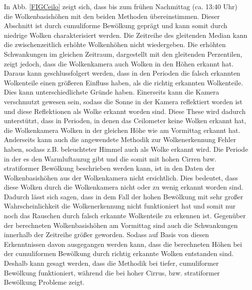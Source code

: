 \documentclass[a4paper,11pt,twoside,german]{article}
\newcommand{\absatz}{\smallbreak}
\begin{document}
In Abb. \ref{FIGCeilo} zeigt sich, dass bis zum frühen Nachmittag (ca. 13:40 Uhr) die Wolkenbasishöhen mit den beiden Methoden übereinstimmen. Dieser Abschnitt ist durch cumuliforme Bewölkung geprägt und kann somit durch niedrige Wolken charakterisiert werden. Die Zeitreihe des gleitenden Median kann die zwischenzeitlich erhöhte Wolkenhöhen nicht wiedergeben. Die erhöhten Schwankungen im gleichen Zeitraum, dargestellt mit den gleitenden Perzentilen, zeigt jedoch, dass die Wolkenkamera auch Wolken in den Höhen erkannt hat. Daraus kann geschlussfolgert werden, dass in den Perioden die falsch erkannten Wolkenteile einen größeren Einfluss haben, als die richtig erkannten Wolkenteile. Dies kann unterschiedlichste Gründe haben. Einerseits kann die Kamera verschmutzt gewesen sein, sodass die Sonne in der Kamera reflektiert worden ist und diese Reflektionen als Wolke erkannt worden sind. Diese These wird dadurch unterstützt, dass in Perioden, in denen das Ceilometer keine Wolken erkannt hat, die Wolkenkamera Wolken in der gleichen Höhe wie am Vormittag erkannt hat. Anderseits kann auch die angewendete Methodik zur Wolkenerkennung Fehler haben, sodass z.B. beleuchteter Himmel auch als Wolke erkannt wird.\absatz
Die Periode in der es den Warmluftauzug gibt und die somit mit hohen Cirren bzw. stratiformer Bewölkung beschrieben werden kann, ist in den Daten der Wolkenbasishöhen aus der Wolkenkamera nicht ersichtlich. Dies bedeutet, dass diese Wolken durch die Wolkenkamera nicht oder zu wenig erkannt worden sind. Dadurch lässt sich sagen, dass in dem Fall der hohen Bewölkung mit sehr großer Wahrscheinlichkeit die Wolkenerkennung nicht funktioniert hat und somit nur noch das Rauschen durch falsch erkannte Wolkenteile zu erkennen ist. Gegenüber der berechneten Wolkenbasishöhen am Vormittag sind auch die Schwankungen innerhalb der Zeitreihe größer geworden. Sodass auf Basis von diesen Erkenntnissen davon ausgegangen werden kann, dass die berechneten Höhen bei der cumuliformen Bewölkung durch richtig erkannte Wolken entstanden sind. Deshalb kann gesagt werden, dass die Methodik bei tiefer, cumuliformer Bewölkung funktioniert, während die bei hoher Cirrus, bzw. stratiformer Bewölkung Probleme zeigt.  



\end{document}
